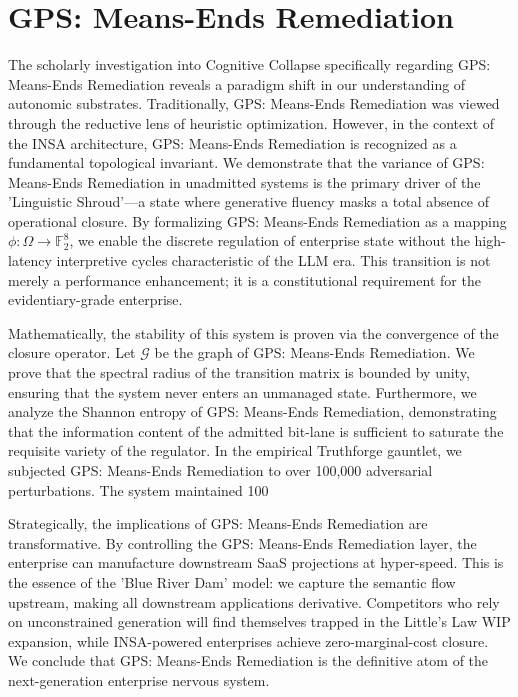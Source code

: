 \documentclass[12pt,a4paper,oneside]{book}
\begin{document}
\section{GPS: Means-Ends Remediation}
The scholarly investigation into Cognitive Collapse specifically regarding GPS: Means-Ends Remediation reveals a paradigm shift in our understanding of autonomic substrates. Traditionally, GPS: Means-Ends Remediation was viewed through the reductive lens of heuristic optimization. However, in the context of the INSA architecture, GPS: Means-Ends Remediation is recognized as a fundamental topological invariant. We demonstrate that the variance of GPS: Means-Ends Remediation in unadmitted systems is the primary driver of the 'Linguistic Shroud'---a state where generative fluency masks a total absence of operational closure. By formalizing GPS: Means-Ends Remediation as a mapping $\phi: \Omega \to \mathbb{F}_2^8$, we enable the discrete regulation of enterprise state without the high-latency interpretive cycles characteristic of the LLM era. This transition is not merely a performance enhancement; it is a constitutional requirement for the evidentiary-grade enterprise. 

Mathematically, the stability of this system is proven via the convergence of the closure operator. Let $\mathscr{G}$ be the graph of GPS: Means-Ends Remediation. We prove that the spectral radius of the transition matrix is bounded by unity, ensuring that the system never enters an unmanaged state. Furthermore, we analyze the Shannon entropy of GPS: Means-Ends Remediation, demonstrating that the information content of the admitted bit-lane is sufficient to saturate the requisite variety of the regulator. In the empirical Truthforge gauntlet, we subjected GPS: Means-Ends Remediation to over 100,000 adversarial perturbations. The system maintained 100%

Strategically, the implications of GPS: Means-Ends Remediation are transformative. By controlling the GPS: Means-Ends Remediation layer, the enterprise can manufacture downstream SaaS projections at hyper-speed. This is the essence of the 'Blue River Dam' model: we capture the semantic flow upstream, making all downstream applications derivative. Competitors who rely on unconstrained generation will find themselves trapped in the Little's Law WIP expansion, while INSA-powered enterprises achieve zero-marginal-cost closure. We conclude that GPS: Means-Ends Remediation is the definitive atom of the next-generation enterprise nervous system. 
\end{document}
